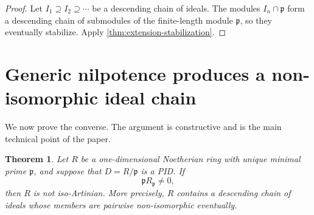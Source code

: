 \documentclass[11pt]{article}
\newtheorem{theorem}{Theorem}[section]
\theoremstyle{definition}
\begin{document}
\begin{proof}
Let $I_1\supseteq I_2\supseteq\cdots$ be a descending chain of ideals.  The modules
$I_n\cap\mathfrak p$ form a descending chain of submodules of the finite-length module
$\mathfrak p$, so they eventually stabilize.  Apply \cref{thm:extension-stabilization}.
\end{proof}

\section{Generic nilpotence produces a non-isomorphic ideal chain}

We now prove the converse.  The argument is constructive and is the main technical point of
the paper.

\begin{theorem}\label{thm:generic-obstruction}
Let $R$ be a one-dimensional Noetherian ring with unique minimal prime $\mathfrak p$, and
suppose that $D=R/\mathfrak p$ is a PID.  If
\[
 \mathfrak pR_{\mathfrak p}\ne0,
\]
then $R$ is not iso-Artinian.  More precisely, $R$ contains a descending chain of ideals whose
members are pairwise non-isomorphic eventually.
\end{theorem}
\end{document}
